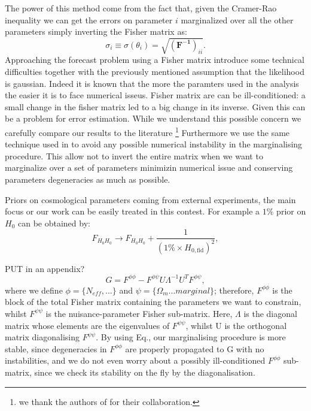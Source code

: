 \documentclass[aps,prd,preprint,groupedaddress]{revtex4-1}
\begin{document}
The power of this method come from the fact that, given the Cramer-Rao inequality we can get the errors on parameter $i$ marginalized over all the other parameters simply inverting the Fisher matrix as:
\begin{equation}
\sigma_i \equiv \sigma (\theta_i) = \sqrt{(\mathbf{ F^{-1}})_{ii}}.
\label{eq:cramer-rao}
\end{equation}
Approaching the forecast problem using a Fisher matrix introduce some technical difficulties together with the previously mentioned assumption that the likelihood is gaussian. Indeed it is known that the more the paramters used in the analysis the easier it is to face numerical isseus. Fisher matrix are can be ill-conditioned: a small change in the fisher matrix led to a big change in its inverse. Given  this can be a problem for error estimation. While we understand this possible concern we carefully compare our results to the literature  \footnote{we thank the authors of \cite{pan:2015} for their collaboration.}
Furthermore we use the same technique used in \cite{2006astro.ph..9591A} to avoid any possible numerical instability in the marginalising procedure. This allow not to invert the entire matrix when we want to marginalize over a set of parameters minimizin numerical issue and conserving parameters degeneracies as much as possible.

Priors on cosmological parameters coming from external experiments, the main focus or our work can be easily treated in this contest.
For example a $1\%$ prior on $H_{0}$ can be obtained by:
\begin{equation}
F_{H_0 H_0} \rightarrow F_{H_0 H_0} + \frac{1}{(1\% \times H_{0,\text{fid}})^2}, 
\end{equation}



 
PUT in an appendix?
\begin{equation}
G = F^{\phi\phi} - F^{\phi\psi}U\Lambda^{-1}U^{T}F^{\phi\psi},
\end{equation}
where we define $\phi = \{N_{eff},...\}$ and $\psi = \{\Omega_{m} ... marginal\}$; therefore, $F^{\phi\phi}$ is the block of the total Fisher matrix containing the parameters we want to constrain, whilst $F^{\psi\psi}$ is the nuisance-parameter Fisher sub-matrix. Here, $\Lambda$ is the diagonal matrix whose elements are the eigenvalues of $F^{\psi\psi}$, whilst U is the orthogonal matrix diagonalising $F^{\psi\psi}$. By using Eq., our marginalising procedure is more stable, since degeneracies in $F^{\phi\phi}$ are properly propagated to G with no instabilities, and we do not even worry about a possibly ill-conditioned $F^{\phi\phi}$ sub-matrix, since we check its stability on the fly by the diagonalisation.
\end{document}
